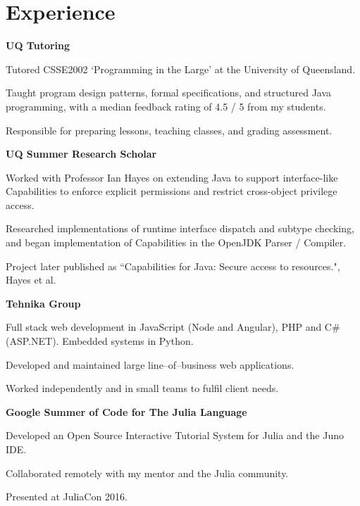 \documentclass[a4paper]{article}
\renewenvironment{itemize}{
  \begin{list}{}{
    \setlength{\leftmargin}{1.5em}
  }
}{
  \end{list}
}
\newcommand{\dateitem}[1] {\item[\textbf{#1 :}]}
\begin{document}
\section*{Experience}
\begin{itemize}
	\dateitem{2017} {\textbf{UQ Tutoring}
		
		Tutored CSSE2002 `Programming in the Large' at the University of Queensland.
		
		Taught program design patterns, formal specifications, and structured Java programming, with a median feedback rating of 4.5 / 5 from my students.
		
		Responsible for preparing lessons, teaching classes, and grading assessment.
	}

	\dateitem{2016 -- 2017} {\textbf{UQ Summer Research Scholar}
		
		Worked with Professor Ian Hayes on extending Java to support interface-like Capabilities to enforce explicit permissions and restrict cross-object privilege access.
		
		Researched implementations of runtime interface dispatch and subtype checking, and began implementation of Capabilities in the OpenJDK Parser / Compiler.
		
		Project later published as ``Capabilities for Java: Secure access to resources.", Hayes et al.
	}
	
	\dateitem{2014 -- 2016} {\textbf{Tehnika Group}
		
		Full stack web development in JavaScript (Node and Angular), PHP and C\# (ASP.NET). Embedded systems in Python.
		
		Developed and maintained large line--of--business web applications.
		
		Worked independently and in small teams to fulfil client needs.
	}
	
	\dateitem{2016} {\textbf{Google Summer of Code for The Julia Language}
		
		Developed an Open Source Interactive Tutorial System for Julia and the Juno IDE.
		
		Collaborated remotely with my mentor and the Julia community.
		
		Presented at JuliaCon 2016.
	}
	
	
\end{itemize}
\end{document}
